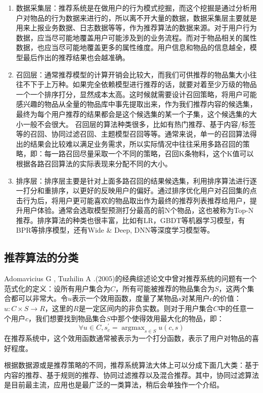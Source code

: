 \documentclass{article}
\begin{document}
	\begin{enumerate}
		\item 数据采集层：推荐系统是在做用户的行为模式挖掘，而这个挖掘是通过分析用户对物品的行为数据来进行的，所以离不开大量的数据，数据采集层主要就是用来上报业务数据、日志数据等等，作为推荐算法的数据来源。对于用户行为数据，应当尽可能地覆盖用户可能涉及到的业务流程。而对于物品相关的属性数据，也应当尽可能地覆盖更多的属性维度。用户信息和物品的信息越全，模型最后作出的推荐结果也会越准确。
		\item 召回层：通常推荐模型的计算开销会比较大，而我们可供推荐的物品集大小往往不下于上万种。如果完全依赖模型进行推荐的话，就要对着至少万级的物品一个一个排序打分，显然成本太高。这时候就需要设计召回策略，将用户可能感兴趣的物品从全量的物品库中事先提取出来，作为我们推荐内容的候选集，最终为每个用户推荐的结果都会是这个候选集的某一个子集，这个候选集的大小一般不会很大。
	召回层的算法种类很多，比如有热门推荐、基于内容/标签等的召回、协同过滤召回、主题模型召回等等。通常来说，单一的召回算法得出的结果会比较难以满足业务需求，所以实际情况中往往采用多路召回的策略，即：每一路召回尽量采取一个不同的策略，召回K条物料，这个K值可以根据各路召回算法的实际表现来分配不同的大小。
		\item 排序层：排序层主要是针对上面多路召回的结果候选集，利用排序算法进行逐一打分和重排序，以更好的反映用户的偏好。通过排序优化用户对召回集的点击行为后，将用户更可能喜欢的物品取出作为最终的推荐列表推荐给用户，提升用户体验。通常会选取模型预测打分最高的前N个物品，这也被称为Top-N推荐。排序算法的种类也很丰富，比如有LR，GBDT等机器学习模型，有BPR等排序模型，还有Wide \& Deep, DNN等深度学习模型等。
	\end{enumerate}

	\subsection{推荐算法的分类}
	Adomavicius G , Tuzhilin A .(2005)的经典综述论文中曾对推荐系统的问题有一个范式化的定义：设所有用户集合为$C$，所有可能被推荐的物品集合为$S$，这两个集合都可以非常大。令$u$表示一个效用函数，度量了某物品$s$对某用户$c$的价值：$u:C\times S\rightarrow R$，这里的$R$是一定区间内的非负实数。则对于用户集合$C$中的任意一个用户$c$，我们想要找到物品集合$S$中那个使得效用最大化的物品，即：
	$$\forall u\in C, s_c^{'}=\mathop{argmax}_{s\in S}u(c,s)$$
	在推荐系统中，这个效用函数通常被表示为一个打分函数，表示了用户对物品的喜好程度。

	根据数据源或是推荐策略的不同，推荐系统算法大体上可以分成下面几大类：基于内容的推荐、基于规则的推荐、协同过滤推荐以及混合推荐。其中，协同过滤算法是目前最主流，应用也是最广泛的一类算法，稍后会单独作一个介绍。
\end{document}
